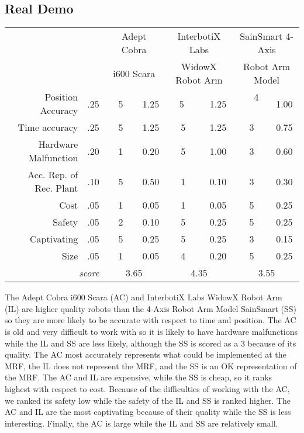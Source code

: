 \documentclass [11pt ]{ report}
\begin{document}
\subsection{Real Demo}
\begin{center}
  \begin{tabular}{r|r||c|c||c|c||c|c||}
                   \multicolumn{2}{c||}{} 
                     & \multicolumn{2}{c||}{Adept Cobra}  
                     & \multicolumn{2}{c||}{InterbotiX Labs}
                     & \multicolumn{2}{c||}{SainSmart 4-Axis} \\ 
                   \multicolumn{2}{c||}{} 
                     & \multicolumn{2}{c||}{i600 Scara}  
                     & \multicolumn{2}{c||}{WidowX Robot Arm}
                     & \multicolumn{2}{c||}{Robot Arm Model} \\ \hline
  Position Accuracy    & .25 &  \ \ 5\ \ & 1.25 & \ \ 5 \ \  & 1.25 & \ \ 4 \ \  & 1.00 \\
  Time accuracy & .25 &  5  &   1.25  & 5  & 1.25  & 3  & 0.75 \\
  Hardware Malfunction & .20 &  1     &   0.20  & 5 & 1.00  & 3  & 0.60 \\
  Acc. Rep. of Rec. Plant  & .10 &  5   &  0.50  & 1  & 0.10  & 3 & 0.30  \\ 
  Cost   & .05 &  1 & 0.05 & 1 & 0.05 & 5  & 0.25 \\
  Safety & .05 &  2 &   0.10  & 5  & 0.25  & 5  & 0.25 \\
  Captivating & .05 &  5  &   0.25  & 5  & 0.25  & 3  & 0.15 \\
  Size  & .05 &  1  &  0.05  & 4  & 0.20  & 5 & 0.25  \\ \hline
  \multicolumn{2}{r||}{\emph{score}} & 
  \multicolumn{2}{c||}{3.65}  &
  \multicolumn{2}{c||}{4.35} &
  \multicolumn{2}{c||}{3.55} 
\end{tabular}
\end{center}

The Adept Cobra i600 Scara (AC) and InterbotiX Labs WidowX Robot Arm (IL) are higher quality robots than the 4-Axis Robot Arm Model SainSmart (SS) so they are more likely to be accurate with respect to time and position. The AC is old and very difficult to work with so it is likely to have hardware malfunctions while the IL and SS are less likely, although the SS is scored as a 3 because of its quality. The AC most accurately represents what could be implemented at the MRF, the IL does not represent the MRF, and the SS is an OK representation of the MRF. The AC and IL are expensive, while the SS is cheap, so it ranks highest with respect to cost. Because of the difficulties of working with the AC, we ranked its safety low while the safety of the IL and SS is ranked higher. The AC and IL are the most captivating because of their quality while the SS is less interesting. Finally, the AC is large while the IL and SS are relatively small.
\end{document}
